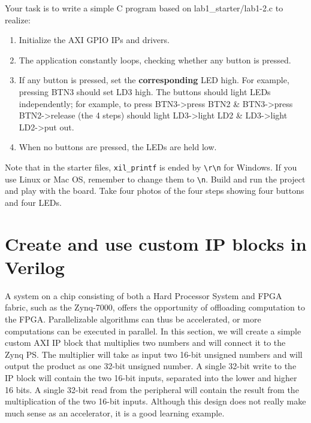 \documentclass[a4paper,12pt,twoside]{article}
\begin{document}
\inputminted[breaklines,breakanywhere,linenos]{tcl}{lab1_2.tcl}
Your task is to write a simple C program based on lab1\_starter/lab1-2.c to realize:
\begin{enumerate}
    \item Initialize the AXI GPIO IPs and drivers.
    \item The application constantly loops, checking whether any button is pressed.
    \item If any button is pressed, set the \textbf{corresponding} LED high. For example, pressing BTN3 should set LD3 high. The buttons should light LEDs independently; for example, to press BTN3->press BTN2 \& BTN3->press BTN2->release (the 4 steps) should light LD3->light LD2 \& LD3->light LD2->put out.
    \item When no buttons are pressed, the LEDs are held low.
\end{enumerate}
Note that in the starter files, \texttt{xil\_printf} is ended by \verb|\r\n| for Windows. If you use Linux or Mac OS, remember to change them to \verb|\n|. Build and run the project and play with the board. Take four photos of the four steps showing four buttons and four LEDs.

\newpage
\section{Create and use custom IP blocks in Verilog}\label{S4}
A system on a chip consisting of both a Hard Processor System and FPGA fabric, such as the Zynq-7000, offers the opportunity of offloading computation to the FPGA. Parallelizable algorithms can thus be accelerated, or more computations can be executed in parallel. In this section, we will create a simple custom AXI IP block that multiplies two numbers and will connect it to the Zynq PS. The multiplier will take as input two 16-bit unsigned numbers and will output the product as one 32-bit unsigned number. A single 32-bit write to the IP block will contain the two 16-bit inputs, separated into the lower and higher 16 bits. A single 32-bit read from the peripheral will contain the result from the multiplication of the two 16-bit inputs. Although this design does not really make much sense as an accelerator, it is a good learning example.
\end{document}
